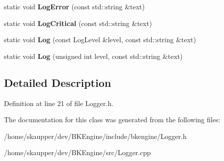 \begin{DoxyCompactItemize}
static void {\bfseries Log\+Error} (const std\+::string \&text)
\item 
\mbox{\label{classbkengine_1_1Logger_a5f5b9a6b3c3f4f958af327b2716161c8}} 
static void {\bfseries Log\+Critical} (const std\+::string \&text)
\item 
\mbox{\label{classbkengine_1_1Logger_a88523c0e10412fdfe8855ca1d956edde}} 
static void {\bfseries Log} (const Log\+Level \&level, const std\+::string \&text)
\item 
\mbox{\label{classbkengine_1_1Logger_a5c4ac2babe0784cd0ce7d09ea95a0ac1}} 
static void {\bfseries Log} (unsigned int level, const std\+::string \&text)
\end{DoxyCompactItemize}


\subsection{Detailed Description}


Definition at line 21 of file Logger.\+h.



The documentation for this class was generated from the following files\+:\begin{DoxyCompactItemize}
\item 
/home/skaupper/dev/\+B\+K\+Engine/include/bkengine/Logger.\+h\item 
/home/skaupper/dev/\+B\+K\+Engine/src/Logger.\+cpp\end{DoxyCompactItemize}
